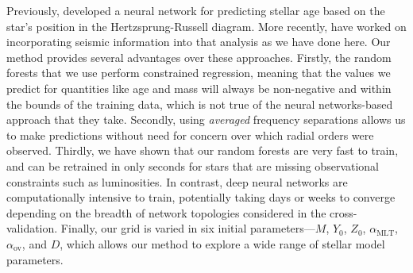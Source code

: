 Previously, \citet{pulone1997age} developed a neural network for predicting stellar age based on the star's position in the Hertzsprung-Russell diagram. More recently, \citet{2016arXiv160200902V} have worked on incorporating seismic information into that analysis as we have done here. Our method provides several advantages over these approaches. Firstly, the random forests that we use perform constrained regression, meaning that the values we predict for quantities like age and mass will always be non-negative and within the bounds of the training data, which is not true of the neural networks-based approach that they take. Secondly, using \emph{averaged} frequency separations allows us to make predictions without need for concern over which radial orders were observed. Thirdly, we have shown that our random forests are very fast to train, and can be retrained in only seconds for stars that are missing observational constraints such as luminosities. In contrast, deep neural networks are computationally intensive to train, potentially taking days or weeks to converge depending on the breadth of network topologies considered in the cross-validation. Finally, our grid is varied in six initial parameters---$M$, $Y_0$, $Z_0$, $\alpha_{\text{MLT}}$, $\alpha_{\text{ov}}$, and $D$, which allows our method to explore a wide range of stellar model parameters.


